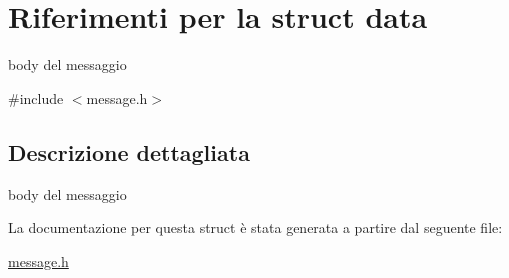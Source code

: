 \hypertarget{structdata}{}\section{Riferimenti per la struct data}
\label{structdata}


body del messaggio  




{\ttfamily \#include $<$message.\+h$>$}



\subsection{Descrizione dettagliata}
body del messaggio 

La documentazione per questa struct è stata generata a partire dal seguente file\+:\begin{DoxyCompactItemize}
\item 
\hyperlink{message_8h}{message.\+h}\end{DoxyCompactItemize}

